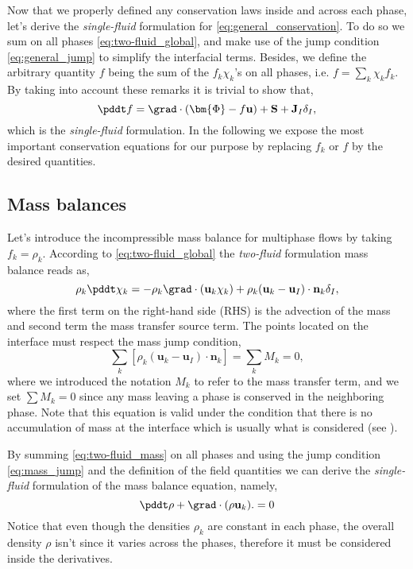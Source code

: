 Now that we properly defined any conservation laws inside and across each phase, let's derive the \textit{single-fluid} formulation for \ref{eq:general_conservation}.
To do so we sum on all phases \ref{eq:two-fluid_global}, and make use of the jump condition \ref{eq:general_jump} to simplify the interfacial terms. 
Besides, we define the arbitrary quantity $f$ being the sum of the $f_k\chi_k$'s on all phases, i.e. $f = \sum_k \chi_k f_k$.
By taking into account these remarks it is trivial to show that, 
\begin{equation}
    \pddt f
    = \grad \cdot (\bm{\Phi} - f \textbf{u})
    + \textbf{S}
    + \textbf{J}_I \delta_I,
    \label{eq:single-fluid_global}
\end{equation}
which is the \textit{single-fluid} formulation. 
In the following we expose the most important conservation equations for our purpose by replacing $f_k$ or $f$ by the desired quantities.  

\subsection{Mass balances}

Let's introduce the incompressible mass balance for multiphase flows by taking $f_k = \rho_k$. 
According to \ref{eq:two-fluid_global} the \textit{two-fluid} formulation mass balance reads as,
\begin{equation}
    \rho_k\pddt\chi_k
    = 
    - \rho_k\grad\cdot(\textbf{u}_k \chi_k)  
    + \rho_k (\textbf{u}_k-\textbf{u}_I) \cdot \textbf{n}_k \delta_I,
    \label{eq:two-fluid_mass}
\end{equation}
where the first term on the right-hand side (RHS) is the advection of the mass and second term the mass transfer source term.
The points located on the interface must respect the mass jump condition,
\begin{equation}
    \sum_k \left[
        \rho_k (\textbf{u}_k-\textbf{u}_I) \cdot \textbf{n}_k
    \right]
    =\sum_k M_k 
    = 0,
    \label{eq:mass_jump}
\end{equation}
where we introduced the notation $M_k$ to refer to the mass transfer term, and we set $\sum M_k =0$ since any mass leaving a phase is conserved in the neighboring phase.
Note that this equation is valid under the condition that there is no accumulation of mass at the 
interface which is usually what is considered (see \citet{morel2015mathematical}). 

By summing \ref{eq:two-fluid_mass} on all phases and using the jump condition \ref{eq:mass_jump} and the definition of the field quantities we can derive the \textit{single-fluid} formulation of the mass balance equation, namely,  
\begin{equation}
    \pddt \rho
    + \grad\cdot(\rho\textbf{u}_k). 
    = 0 
    \label{eq:single-fluid_mass}
\end{equation}
Notice that even though the densities $\rho_k$ are constant in each phase, the overall density $\rho$ isn't since it varies across the phases, therefore it must be considered inside the derivatives.


